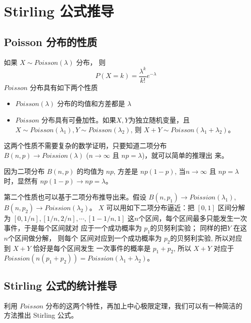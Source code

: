 %
\chapter{Stirling 公式推导}
\label{chap:stirling}

\section{Poisson 分布的性质}

如果 $X \sim Poisson(\lambda)$ 分布， 则
$$ P(X = k) = \frac{\lambda^k}{k!}{e^{ - \lambda }} $$
$Poisson$ 分布具有如下两个性质
\begin{itemize}
\item $Poisson(\lambda)$ 分布的均值和方差都是 $\lambda$
\item $Poisson$ 分布具有可叠加性。如果$X,Y$为独立随机变量，且 $X\sim
Poisson(\lambda_1), Y\sim Poisson(\lambda_2)$, 则 $X+Y\sim Poisson(\lambda_1+\lambda_2)$。
\end{itemize}

这两个性质不需要复杂的数学证明，只要知道二项分布 $B(n,p) \rightarrow
Poission(\lambda)$ ($n\rightarrow \infty$ 且 $np=\lambda$)，就可以简单的推理出
来。

因为二项分布 $B(n,p)$ 的均值为 $np$, 方差是 $np(1-p)$, 当$n\rightarrow
\infty$ 且 $np=\lambda$ 时，显然有 $np(1-p)\rightarrow np=\lambda$。

第二个性质也可以基于二项分布推导出来。假设 
$B(n,p_1) \rightarrow Poission(\lambda_1)$, 
$B(n,p_2) \rightarrow Poission(\lambda_2)$。
$X$ 可以用如下二项分布逼近：把 $[0,1]$ 区间分解为 $[0, 1/n], [1/n, 2/n],
\cdots, [1-1/n, 1]$ 这$n$个区间，每个区间最多只能发生一次事件，于是每个区间就对
应于一个成功概率为 $p_1$的贝努利实验； 同样的把$Y$ 在这$n$个区间做分解， 则每个
区间对应到一个成功概率为 $p_2$的贝努利实验, 所以对应到 $X+Y$ 恰好是每个区间发生
一次事件的概率是 $p_1 + p_2$, 所以 $X+Y$ 对应于 $Poission(n(p_1+p_2))=Poission(\lambda_1+\lambda_2)$。


\section{Stirling 公式的统计推导}

利用 $Poisson$ 分布的这两个特性，再加上中心极限定理，我们可以有一种简洁的方法推出 Stirling 公式。

